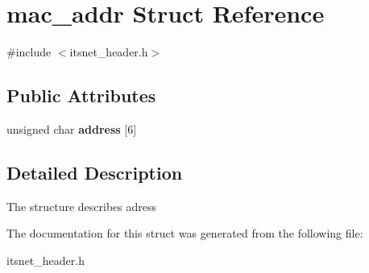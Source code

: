 \hypertarget{structmac__addr}{\section{mac\-\_\-addr \-Struct \-Reference}
\label{structmac__addr}
}


{\ttfamily \#include $<$itsnet\-\_\-header.\-h$>$}

\subsection*{\-Public \-Attributes}
\begin{DoxyCompactItemize}
\item 
\hypertarget{structmac__addr_a2ef3194fc8d2b31af7d3535487e24377}{unsigned char {\bfseries address} \mbox{[}6\mbox{]}}\label{structmac__addr_a2ef3194fc8d2b31af7d3535487e24377}

\end{DoxyCompactItemize}


\subsection{\-Detailed \-Description}
\-The structure describes adress 

\-The documentation for this struct was generated from the following file\-:\begin{DoxyCompactItemize}
\item 
itsnet\-\_\-header.\-h\end{DoxyCompactItemize}
